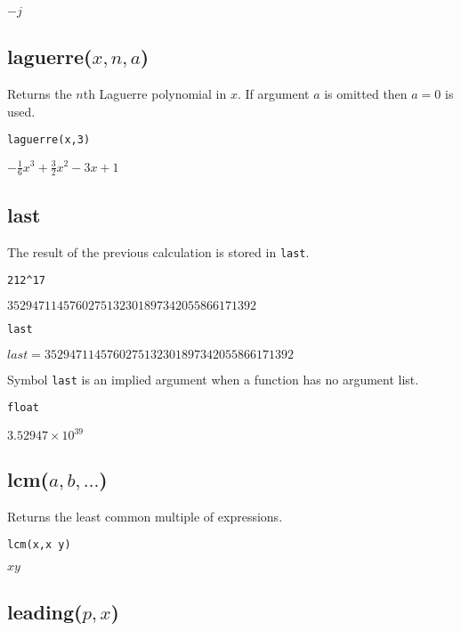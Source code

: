\noindent
$-j$

\subsection*{laguerre($x,n,a$)}

Returns the $n$th Laguerre polynomial in $x$.
If argument $a$ is omitted then $a=0$ is used.

{\color{blue}
\begin{verbatim}
laguerre(x,3)
\end{verbatim}
}

\noindent
$\displaystyle -\tfrac{1}{6}x^3+\tfrac{3}{2}x^2-3x+1$

\subsection*{last}

The result of the previous calculation is stored in {\tt last}.

{\color{blue}
\begin{verbatim}
212^17
\end{verbatim}
}

\noindent
$3529471145760275132301897342055866171392$

{\color{blue}
\begin{verbatim}
last
\end{verbatim}
}

\noindent
$last=3529471145760275132301897342055866171392$

\bigskip
\noindent
Symbol {\tt last} is an implied argument when a function has no argument list.

{\color{blue}
\begin{verbatim}
float
\end{verbatim}
}

\noindent
$\displaystyle 3.52947\times10^{39}$

\subsection*{lcm($a,b,\ldots$)}

Returns the least common multiple of expressions.

{\color{blue}
\begin{verbatim}
lcm(x,x y)
\end{verbatim}
}

\noindent
$xy$

\subsection*{leading($p,x$)}

